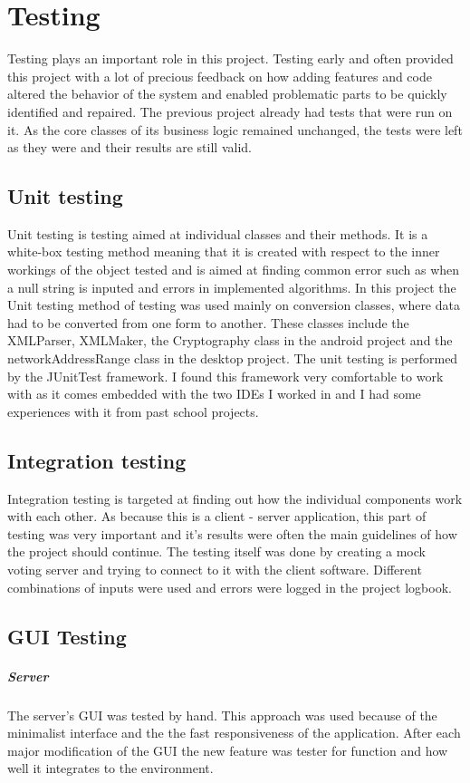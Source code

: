 \documentclass[11pt,twoside,a4paper]{book}
\begin{document}
\chapter{Testing}
Testing plays an important role in this project. Testing early and often provided this project with a lot of precious feedback on how adding features and code altered the behavior of the system and enabled problematic parts to be quickly identified and repaired. The previous project \cite{baklarkaJV} already had tests that were run on it. As the core classes of its business logic remained unchanged, the tests were left as they were and their results are still valid.
\section{Unit testing}
Unit testing is testing aimed at individual classes and their methods. It is a white-box testing method meaning that it is created with respect to the inner workings of the object tested and is aimed at finding common error such as when a null string is inputed and errors in implemented algorithms. In this project the Unit testing method of testing was used mainly on conversion classes, where data had to be converted from one form to another. These classes include the XMLParser, XMLMaker, the Cryptography class in the android project and the networkAddressRange class in the desktop project. The unit testing is performed by the JUnitTest framework\cite{junit}. I found this framework very comfortable to work with as it comes embedded with the two IDEs I worked in and I had some experiences with it from past school projects.
\section{Integration testing}
Integration testing is targeted at finding out how the individual components work with each other. As because this is a client - server application, this part of testing was very important and it's results were often the main guidelines of how the project should continue. The testing itself was done by creating a mock voting server and trying to connect to it with the client software. Different combinations of inputs were used and errors were logged in the project logbook.
\section{GUI Testing}
\paragraph{Server}
The server's GUI was tested by hand. This approach was used because of the minimalist interface and the the fast responsiveness of the application. After each major modification of the GUI the new feature was tester for function and how well it integrates to the environment.
\end{document}
